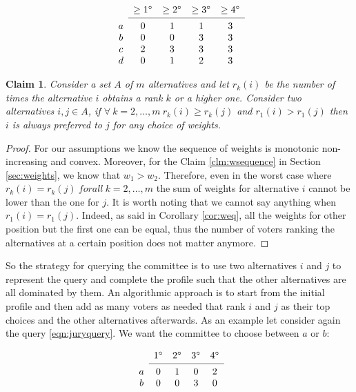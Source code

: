 \documentclass[12pt]{article}
\newtheorem{claim}{Claim}
\begin{document}
\[
\begin{array}{ccccc}
& \geq 1^\circ
& \geq 2^\circ
& \geq 3^\circ
& \geq 4^\circ \\
\cmidrule{2-5}
a 
& 0
& 1
& 1
& 3 \\
b
& 0
& 0
& 3
& 3 \\
c
& 2
& 3
& 3
& 3 \\
d
& 0
& 1
& 2
& 3 \\
\end{array}
\]


\begin{claim}
	Consider a set $A$ of $m$ alternatives and let $r_k(i)$ be the number of times the alternative $i$ obtains a rank $k$ or a higher one. Consider two alternatives $ i,j \in A$, if $\forall \ k=2, \dots,m \ r_k(i)\geq r_k(j)$ and $r_1(i) > r_1(j)$ then $i$ is always preferred to $j$ for any choice of weights.
\end{claim}

\begin{proof}
	For our assumptions we know the sequence of weights is monotonic non-increasing and convex. Moreover, for the Claim \ref{clm:wsequence} in Section \ref{sec:weights}, we know that $w_1 > w_2$. Therefore, even in the worst case where $r_k(i) = r_k(j) \ forall \ k=2, \dots,m$ the sum of weights for alternative $i$ cannot be lower than the one for $j$. It is worth noting that we cannot say anything when $r_1(i) = r_1(j)$. Indeed, as said in Corollary \ref{cor:weq}, all the weights for other position but the first one can be equal, thus the number of voters ranking the alternatives at a certain position does not matter anymore.	
\end{proof}

So the strategy for querying the committee is to use two alternatives $i$ and $j$ to represent the query and complete the profile such that the other alternatives are all dominated by them. An algorithmic approach is to start from the initial profile and then add as many voters as needed that rank $i$ and $j$ as their top choices and the other alternatives afterwards. As an example let consider again the query \ref*{eqn:juryquery}. We want the committee to choose between $a$ or $b$:

\[
\begin{array}{ccccc}
& 1^\circ
& 2^\circ
& 3^\circ
& 4^\circ \\
\cmidrule{2-5}
a 
& 0
& 1
& 0
& 2 \\
b
& 0
& 0
& 3
& 0 \\
\end{array}
\]
\end{document}
